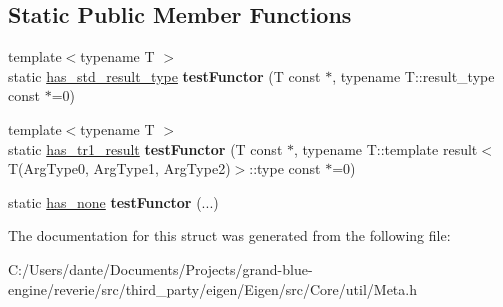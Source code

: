 \subsection*{Static Public Member Functions}
\begin{DoxyCompactItemize}
\item 
\mbox{\label{struct_eigen_1_1internal_1_1result__of_3_01_func_07_arg_type0_00_01_arg_type1_00_01_arg_type2_08_4_a0466468ea1c62ed6ccc58224b9f32339}} 
{\footnotesize template$<$typename T $>$ }\\static \mbox{\hyperlink{struct_eigen_1_1internal_1_1has__std__result__type}{has\+\_\+std\+\_\+result\+\_\+type}} {\bfseries test\+Functor} (T const $\ast$, typename T\+::result\+\_\+type const $\ast$=0)
\item 
\mbox{\label{struct_eigen_1_1internal_1_1result__of_3_01_func_07_arg_type0_00_01_arg_type1_00_01_arg_type2_08_4_ae02c3ef769fda8c4585f3261306030b7}} 
{\footnotesize template$<$typename T $>$ }\\static \mbox{\hyperlink{struct_eigen_1_1internal_1_1has__tr1__result}{has\+\_\+tr1\+\_\+result}} {\bfseries test\+Functor} (T const $\ast$, typename T\+::template result$<$ T(Arg\+Type0, Arg\+Type1, Arg\+Type2)$>$\+::type const $\ast$=0)
\item 
\mbox{\label{struct_eigen_1_1internal_1_1result__of_3_01_func_07_arg_type0_00_01_arg_type1_00_01_arg_type2_08_4_a9ab5bd241cc11f5e5207c107c628fc28}} 
static \mbox{\hyperlink{struct_eigen_1_1internal_1_1has__none}{has\+\_\+none}} {\bfseries test\+Functor} (...)
\end{DoxyCompactItemize}


The documentation for this struct was generated from the following file\+:\begin{DoxyCompactItemize}
\item 
C\+:/\+Users/dante/\+Documents/\+Projects/grand-\/blue-\/engine/reverie/src/third\+\_\+party/eigen/\+Eigen/src/\+Core/util/Meta.\+h\end{DoxyCompactItemize}

